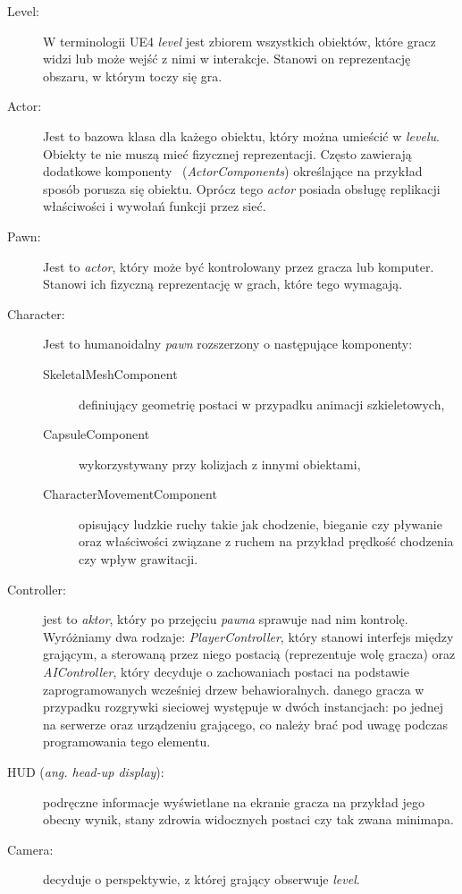 \documentclass[multip]{SGGW-thesis}
\begin{document}
\begin{description}
\item[Level:] W terminologii UE4 {\em level} jest zbiorem wszystkich obiektów, które gracz widzi lub może wejść z nimi w interakcje. Stanowi on reprezentację obszaru, w którym toczy się gra.
\item[Actor:]Jest to bazowa klasa dla każego obiektu, który można umieścić w {\em levelu}. Obiekty te nie muszą mieć fizycznej reprezentacji. Często zawierają dodatkowe komponenty ~({\em ActorComponents}) określające na przykład sposób porusza się obiektu. Oprócz tego {\em actor} posiada obsługę replikacji właściwości i wywołań funkcji przez sieć.
\item[Pawn:]Jest to {\em actor}, który może być kontrolowany przez gracza lub komputer. Stanowi ich fizyczną reprezentację w grach, które tego wymagają.
\item[Character:]Jest to humanoidalny {\em pawn} rozszerzony o następujące komponenty:
	\begin{description}
	\item[SkeletalMeshComponent] definiujący geometrię postaci w przypadku animacji szkieletowych,
	\item[CapsuleComponent] wykorzystywany przy kolizjach z innymi obiektami,
	\item[CharacterMovementComponent] opisujący ludzkie ruchy takie jak chodzenie, bieganie czy pływanie oraz właściwości związane z ruchem na przykład prędkość chodzenia czy wpływ grawitacji.
	\end{description}
\item[Controller:] jest to {\em aktor}, który po przejęciu {\em pawna} sprawuje nad nim kontrolę. Wyróżniamy dwa rodzaje: {\em PlayerController}, który stanowi interfejs między grającym, a sterowaną przez niego postacią (reprezentuje wolę gracza) oraz {\em AIController}, który decyduje o zachowaniach postaci na podstawie zaprogramowanych wcześniej drzew behawioralnych.
 danego gracza w przypadku rozgrywki sieciowej występuje w dwóch instancjach: po jednej na serwerze oraz urządzeniu grającego, co należy brać pod uwagę podczas programowania tego elementu.
\item[HUD ({\em ang. head-up display}):] podręczne informacje wyświetlane na ekranie gracza na przykład jego obecny wynik, stany zdrowia widocznych postaci czy tak zwana minimapa.
\item[Camera:] decyduje o perspektywie, z której grający obserwuje {\em level}.

\end{description}
\end{document}
